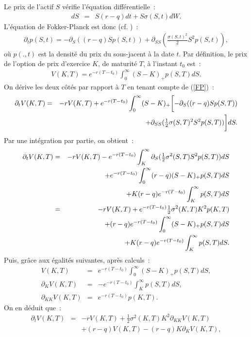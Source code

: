 Le prix de l'actif $S$ v\'erifie l'\'equation diff\'erentielle~:
\begin{eqnarray*}
dS &=& S(r-q)dt + S\sigma(S,t)dW.
\end{eqnarray*}
L'\'equation de Fokker-Planck est donc (cf. \cite{dup:risk:94})~:
\begin{eqnarray}
\partial_tp(S,t) = -\partial_S((r-q)Sp(S,t)) + 
\partial_{SS}(\frac{\sigma(S,t)^2}{2}S^2p(S,t)), \label{FP}
\end{eqnarray}
o\`u $p(.,t)$ est la densit\'e du prix du sous-jacent \`a la date 
$t$. Par d\'efinition, le prix de l'option de prix d'exercice $K$, 
de maturit\'e $T$, \`a l'instant $t_0$ est~:
\begin{eqnarray*}
V(K,T) = e^{-r(T-t_0)}\int_{0}^{\infty}(S-K)_+p(S,T)dS.
\end{eqnarray*}
On d\'erive les deux c\^ot\'es par rapport \`a $T$ en tenant compte 
de (\ref{FP})~:
\begin{eqnarray*}
\partial_tV(K,T) &=& -rV(K,T) + 
e^{-r(T-t_0)}\int_{0}^{\infty}(S-K)_+ 
\biggl[-\partial_S((r-q)Sp(S,T)) \\
&& + \partial_{SS}(\mbox{$\frac{1}{2}$}\sigma(S,T)^2S^2p(S,T))\biggr ]dS.\\
\end{eqnarray*}
Par une int\'egration par partie, on obtient~:
\begin{eqnarray*}
\partial_tV(K,T) &=& -rV(K,T) - e^{-r(T-t_0)} 
\int_K^\infty \partial_S(\mbox{$\frac{1}{2}$}\sigma^2(S,T)S^2p(S,T))dS\\
&& +e^{-r(T-t_0)}\int_0^\infty (r-q)(S-K)_+p(S,T)dS \\
&& + K(r-q)e^{-r(T-t_0)}\int_K^\infty p(S,T)dS\\
&=& -rV(K,T) + e^{-r(T-t_0)} \mbox{$\frac{1}{2}$}\sigma^2(K,T)K^2p(K,T)\\
&& + (r-q)e^{-r(T-t_0)}\int_0^\infty (S-K)_+p(S,T)dS\\
&& + K(r-q)e^{-r(T-t_0)}\int_K^\infty p(S,T)dS.
\end{eqnarray*}
Puis, gr\^ace aux \'egalit\'es suivantes, apr\`es calculs~:
\begin{eqnarray*}
V(K,T) &=& e^{-r(T-t_0)}\int_{0}^{\infty}(S-K)_+p(S,T)dS, \\
\partial_K V(K,T) &=& -e^{-r(T-t_0)}\int_K^\infty p(S,T)dS, \\
\partial_{KK}V(K,T) &=& e^{-r(T-t_0)}p(K,T).
\end{eqnarray*}
On en d\'eduit que~:
\begin{eqnarray*}
\partial_tV(K,T) &=&  -rV(K,T) +  
\frac{1}{2}\sigma^2(K,T)K^2\partial_{KK}V(K,T) \\
&&+ (r-q)V(K,T) -(r-q)K\partial_KV(K,T),
\end{eqnarray*}
